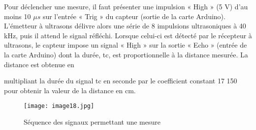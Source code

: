 Pour déclencher une mesure, il faut présenter une impulsion « High » (5
V) d'au moins 10 $\mu s$ sur l'entrée « Trig » du capteur (sortie de la carte
Arduino). L'émetteur à ultrasons délivre alors une série de 8 impulsions
ultrasoniques à 40 kHz, puis il attend le signal réfléchi. Lorsque
celui-ci est détecté par le récepteur à ultrasons, le capteur impose un
signal « High » sur la sortie « Echo » (entrée de la carte Arduino) dont la durée, tc, est proportionnelle à la distance
mesurée. La distance est obtenue en

multipliant la durée du signal tc en seconde par le coefficient constant
17 150 pour obtenir la valeur de la distance en cm.
\begin{figure}[!htb]
\begin{center}
\texttt{[image: image18.jpg]}
\caption{Séquence des signaux permettant une mesure  \label{fig16}}
\end{center}
\end{figure}